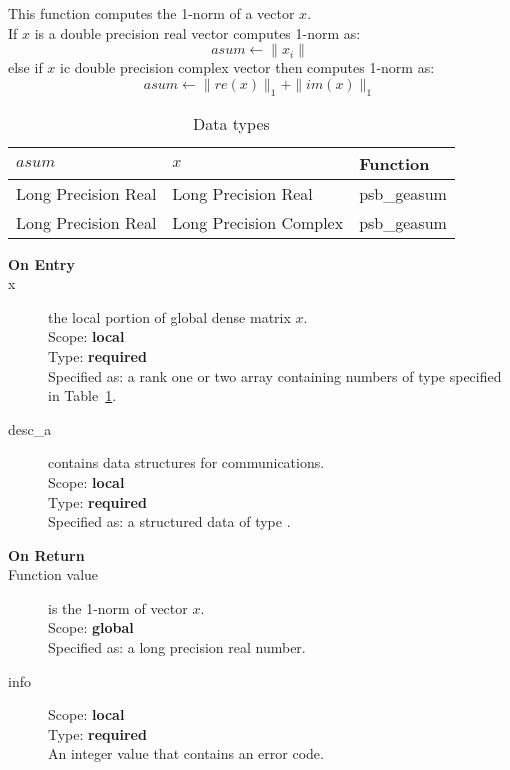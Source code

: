 
This function computes the 1-norm of a vector $x$.\\
If $x$ is a double precision real vector
computes 1-norm as:
\[ asum \leftarrow  \|x_i\|\]
else if $x$ ic double precision complex vector then computes 1-norm  as:
\[ asum \leftarrow \|re(x)\|_1 + \|im(x)\|_1\]



\begin{table}[h]
\begin{center}
\begin{tabular}{lll}
\hline
$asum$ & $x$ & {\bf Function}\\
\hline
Long Precision Real&Long Precision Real & psb\_geasum \\
Long Precision Real&Long Precision Complex & psb\_geasum \\
\hline
\end{tabular}
\end{center}
\caption{Data types\label{tab:f90asum}}
\end{table}

\begin{description}
\item[\bf On Entry]
\item[x] the local portion of global dense matrix
$x$. %
\\
Scope: {\bf local} \\
Type: {\bf required} \\
Specified as: a rank one or two array 
containing numbers of type specified in
Table~\ref{tab:f90asum}.
\item[desc\_a] contains data structures for communications.\\
Scope: {\bf local} \\
Type: {\bf required}\\
Specified as: a structured data of type \descdata.

\item[\bf On Return] 
\item[Function value] is the 1-norm of vector $x$.\\
Scope: {\bf global} \\
Specified as: a long precision real  number.
\item[info]
Scope: {\bf local} \\
Type: {\bf required} \\
An integer value that contains an error code. 
\end{description}


